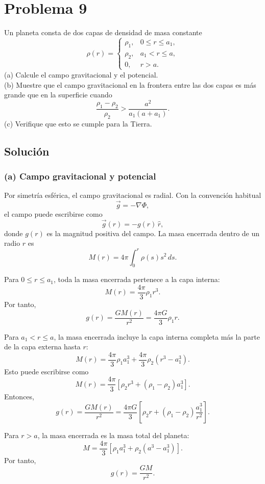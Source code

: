 \documentclass[a4paper]{article}
\begin{document}
\section{Problema 9}

Un planeta consta de dos capas de densidad de masa constante
$$
\rho(r)=
\left\{
\begin{array}{ll}
\rho_1, & 0\le r\le a_1,\\[2mm]
\rho_2, & a_1<r\le a,\\[2mm]
0, & r>a.
\end{array}
\right.
$$
(a) Calcule el campo gravitacional y el potencial. \\
(b) Muestre que el campo gravitacional en la frontera entre las dos capas es más grande que en la superficie cuando
$$
\frac{\rho_1-\rho_2}{\rho_2}>\frac{a^2}{a_1(a+a_1)}.
$$
(c) Verifique que esto se cumple para la Tierra.



\subsection{Solución}

\subsubsection{(a) Campo gravitacional y potencial}

Por simetría esférica, el campo gravitacional es radial. Con la convención habitual
$$
\vec g=-\nabla\Phi,
$$
el campo puede escribirse como
$$
\vec g(r)=-g(r)\,\hat r,
$$
donde $g(r)$ es la magnitud positiva del campo. La masa encerrada dentro de un radio $r$ es
$$
M(r)=4\pi\int_0^r \rho(s)s^2\,ds.
$$

Para $0\le r\le a_1$, toda la masa encerrada pertenece a la capa interna:
$$
M(r)=\frac{4\pi}{3}\rho_1 r^3.
$$
Por tanto,
$$
g(r)=\frac{G M(r)}{r^2}=\frac{4\pi G}{3}\rho_1 r.
$$

Para $a_1<r\le a$, la masa encerrada incluye la capa interna completa más la parte de la capa externa hasta $r$:
$$
M(r)=\frac{4\pi}{3}\rho_1 a_1^3+\frac{4\pi}{3}\rho_2\left(r^3-a_1^3\right).
$$
Esto puede escribirse como
$$
M(r)=\frac{4\pi}{3}\left[\rho_2 r^3+(\rho_1-\rho_2)a_1^3\right].
$$
Entonces,
$$
g(r)=\frac{G M(r)}{r^2}
=\frac{4\pi G}{3}\left[\rho_2 r+(\rho_1-\rho_2)\frac{a_1^3}{r^2}\right].
$$

Para $r>a$, la masa encerrada es la masa total del planeta:
$$
M=\frac{4\pi}{3}\left[\rho_1 a_1^3+\rho_2(a^3-a_1^3)\right].
$$
Por tanto,
$$
g(r)=\frac{GM}{r^2}.
$$
\end{document}
